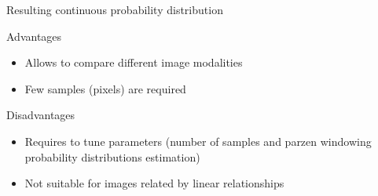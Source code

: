 Resulting continuous probability distribution 



Advantages

\begin{itemize}
\item Allows to compare different image modalities
\item Few samples (pixels) are required
\end{itemize}

Disadvantages

\begin{itemize}
\item Requires to tune parameters (number of samples and parzen windowing probability distributions estimation)
\item Not suitable for images related by linear relationships
\end{itemize}





